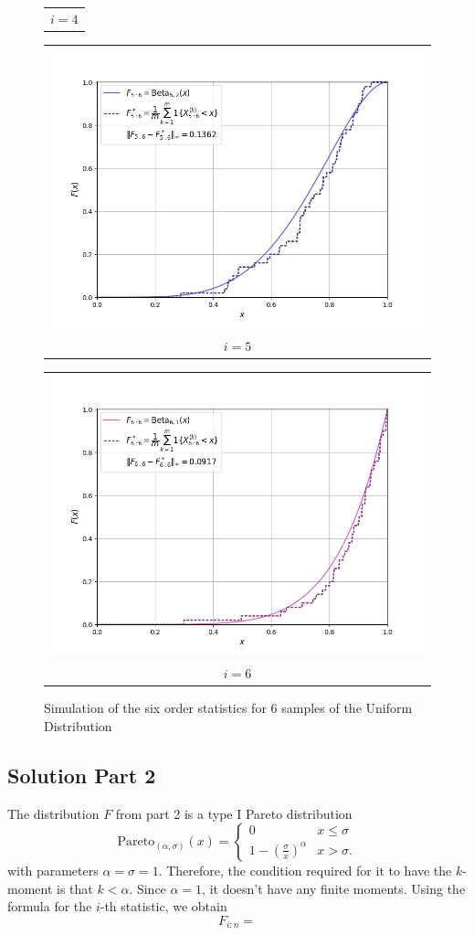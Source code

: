\begin{figure}[H]
\begin{tabular}{@{}c@{}}
        $i = 4$
    \end{tabular}
    \begin{tabular}{@{}c@{}}
        \includegraphics[trim={1.1cm 0.5cm 1.5cm 0cm}, clip,width=.46\linewidth]{../simulation/unif_order_5:6.png} \\
        $i = 5$
      \end{tabular}
    \begin{tabular}{@{}c@{}}
        \includegraphics[trim={1.1cm 0.5cm 1.5cm 0cm}, clip,width=.46\linewidth]{../simulation/unif_order_6:6.png} \\
        $i = 6$
    \end{tabular}
    \caption{Simulation of the six order statistics for 6 samples of the Uniform Distribution}
\end{figure}

\newpage

\subsection*{Solution Part 2}

The distribution $F$ from part 2 is a type I Pareto distribution
\[ \text{Pareto}_{(\alpha, \sigma)}(x) = \begin{cases}
    0 & x\leq \sigma \\
    1- {\left( \frac{\sigma}{x} \right)}^{\alpha} & x > \sigma.
\end{cases} \]
with parameters $\alpha = \sigma = 1$. Therefore, the condition required for it to have the $k$-moment is that $k < \alpha$. Since $\alpha = 1$, it doesn't have any finite moments. Using the formula for the $i$-th statistic, we obtain
\[ F_{i:n} =  \]

